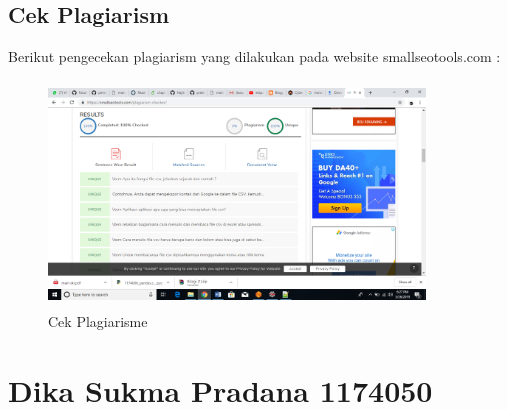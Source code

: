 \subsection{Cek Plagiarism}
Berikut pengecekan plagiarism yang dilakukan pada website smallseotools.com : 
\begin{figure}[!htbp]
	\centering
	\includegraphics[height=6cm, width=10cm]{figures/4/1174042/1174042_plagiat.png}
	\caption{Cek Plagiarisme}
	\label{}
\end{figure}

\section{Dika Sukma Pradana 1174050}

